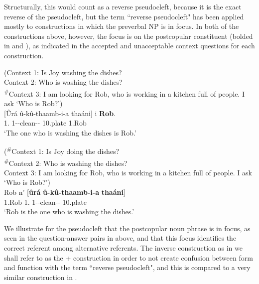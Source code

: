\documentclass[output=paper]{langscibook}
\begin{document}
\z


Structurally, this would count as a reverse pseudocleft, because it is the exact reverse of the pseudocleft, but the term ``reverse pseudocleft" has been applied mostly to constructions in which the preverbal NP is in focus. In both of the constructions above, however, the focus is on the postcopular constituent (bolded in  and ), as indicated in the accepted and unacceptable context questions for each construction.

\ea
\label{bkm:Ref111708000}
(Context 1: Is Joy washing the dishes?\\
Context 2: Who is washing the dishes?\\
\textsuperscript{\#}Context 3: I am looking for Rob, who is working in a kitchen full of people. I ask ‘Who is Rob?’)\\
\gll
{}[Ûrá  û-kû-thaamb-i-a  thaáni]  i  \textbf{Rob}.\\
{\db}1.\RM{} 1\RM-\PRS{}-clean-\IC{}-\FV{}  10.plate \COP{} 1.Rob\\
\glt
‘The one who is washing the dishes is Rob.’

\ex
\label{bkm:Ref111720154}
(\textsuperscript{\#}Context 1: Is Joy doing the dishes?\\
\textsuperscript{\#}Context 2: Who is washing the dishes?\\
Context 3: I am looking for Rob, who is working in a kitchen full of people. I ask ‘Who is Rob?’)\\
\gll
Rob  n’  [\textbf{ûrá}  \textbf{û-kû-thaamb-i-a}  \textbf{thaáni}] \\
1.Rob \COP{} {\db}1.\RM{} 1\RM-\PRS{}-clean-\IC{}-\FV{}  10.plate\\
\glt
‘Rob is the one who is washing the dishes.’

\z


We illustrate for the pseudocleft that the postcopular noun phrase is in focus, as seen in the question-answer pairs in  above, and that this focus identifies the correct referent among alternative referents. The inverse construction as in  we shall refer to as the \NI+\RM{} construction in order to not create confusion between form and function with the term ``reverse pseudocleft", and this is compared to a very similar construction in .
\end{document}
